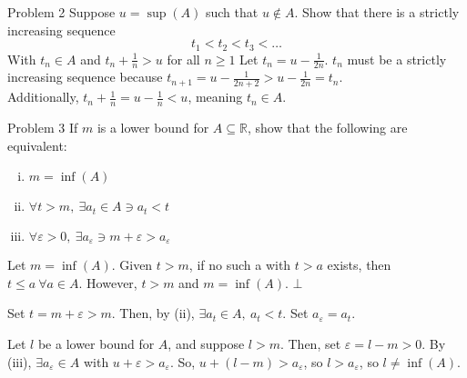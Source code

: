 \documentclass[9pt]{extarticle}
\newcommand{\R}{\mathbb{R}}
\begin{document}
  \begin{problem}{Problem 2}
    Suppose $u = \sup(A)$ such that $u\notin A$. Show that there is a strictly increasing sequence
    \[
      t_1 < t_2 < t_3 < \dots
    \] 
    With $t_n \in A$ and $t_n + \frac{1}{n} > u$ for all $n \geq 1$
    \tcblower
    Let $t_n = u-\frac{1}{2n}$. $t_n$ must be a strictly increasing sequence because $t_{n+1} = u - \frac{1}{2n+2} > u-\frac{1}{2n} = t_n$.\\

    Additionally, $t_n + \frac{1}{n} = u-\frac{1}{n} < u$, meaning $t_n\in A$.
  \end{problem}
  \begin{problem}{Problem 3}
    If $m$ is a lower bound for $A\subseteq \R$, show that the following are equivalent:
    \begin{enumerate}[(i)]
      \item $m = \inf(A)$
      \item $\forall t > m,~\exists a_t\in A \ni a_t < t$
      \item $\forall \varepsilon > 0,~\exists a_{\varepsilon} \ni m+\varepsilon > a_{\varepsilon}$
    \end{enumerate}
    \tcblower
    \begin{description}[font=\normalfont]
      \item[(i) $\Rightarrow$ (ii)] Let $m = \inf(A)$. Given $t > m$, if no such a with $t > a$ exists, then $t\leq a~\forall a\in A$. However, $t > m$ and $m = \inf(A)$. $\bot$
      \item[(ii) $\Rightarrow$ (iii)] Set $t = m + \varepsilon > m$. Then, by (ii), $\exists a_t\in A,~a_t < t$. Set $a_{\varepsilon} = a_t$.
      \item[(iii) $\Rightarrow$ (i)] Let $l$ be a lower bound for $A$, and suppose $l > m$. Then, set $\varepsilon = l-m > 0$. By (iii), $\exists a_{\varepsilon}\in A$ with $u+\varepsilon > a_{\varepsilon}$. So, $u + (l-m) > a_{\varepsilon}$, so $l > a_{\varepsilon}$, so $l \neq \inf(A)$.
    \end{description}
  \end{problem}
\end{document}
